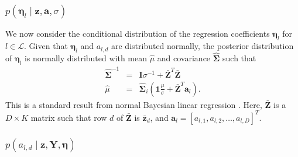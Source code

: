 \subsubsection{$p(\boldsymbol\eta_{l}\mid\mathbf{z},\mathbf{a},\sigma)$}

We now consider the conditional distribution of the regression coefficients
$\boldsymbol\eta_{l}$ for $l\in\mathcal{L}$. Given that $\boldsymbol\eta_{l}$
and $a_{l,d}$ are distributed normally, the posterior distribution
of $\boldsymbol\eta_{l}$ is normally distributed with mean $\hat{\mu}$
and covariance $\hat{\mathbf{\Sigma}}$ such that %
\begin{eqnarray}
\hat{\mathbf{\Sigma}}^{-1} & = & \mathbf{I}\sigma^{-1}+\bar{\mathbf{Z}}^{T}\bar{\mathbf{Z}}\\
\hat{\mu} & = & \hat{\mathbf{\Sigma}}_{i}\left(\mathbf{1}\frac{\mu}{\sigma}+\bar{\mathbf{Z}}^{T}\mathbf{a}_{l}\right).\end{eqnarray}
 This is a standard result from normal Bayesian linear regression
\citep{BishopPRML}. Here, $\bar{\mathbf{Z}}$ is a $D\times K$ matrix
such that row $d$ of $\mathbf{\bar{Z}}$ is $\bar{\mathbf{z}}_{d}$, and $\mathbf{a}_{l}=[a_{l,1},a_{l,2},\ldots,a_{l,D}]^{T}$.



\subsubsection{$p\left(a_{l,d}\mid\mathbf{z},\mathbf{Y},\mathbf{\boldsymbol\eta}\right)$}

